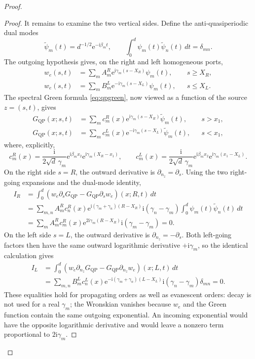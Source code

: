 \documentclass[11pt]{article}
\newcommand{\ii}{\mathrm i}
\newcommand{\ee}{\mathrm e}
\newcommand{\QP}{\mathrm{QP}}
\theoremstyle{plain}
\theoremstyle{definition}
\theoremstyle{remark}
\begin{document}
\begin{proof}
\begin{proof}
It remains to examine the two vertical sides.  Define the anti-quasiperiodic
dual modes
\[
\widetilde\psi_m(t)=d^{-1/2}\ee^{-\ii\beta_m t},\qquad
\int_0^d\psi_m(t)\widetilde\psi_n(t)\,dt=\delta_{mn}.
\]
The outgoing hypothesis gives, on the right and left homogeneous ports,
\[
\begin{aligned}
w_e(s,t)&=\sum_m A_m^R
 \ee^{\ii\gamma_m(s-X_R)}\psi_m(t),&&s\geq X_R,\\
w_e(s,t)&=\sum_m B_m^L
 \ee^{-\ii\gamma_m(s-X_L)}\psi_m(t),&&s\leq X_L.
\end{aligned}
\]
The spectral Green formula \eqref{eq:qpgreen}, now viewed as a function of
the source \(z=(s,t)\), gives
\[
\begin{aligned}
G_{\QP}(x;s,t)
 &=\sum_m c_m^R(x)\ee^{\ii\gamma_m(s-X_R)}
   \widetilde\psi_m(t),&&s>x_1,\\
G_{\QP}(x;s,t)
 &=\sum_m c_m^L(x)\ee^{-\ii\gamma_m(s-X_L)}
   \widetilde\psi_m(t),&&s<x_1,
\end{aligned}
\]
where, explicitly,
\[
c_m^R(x)=\frac{\ii}{2\sqrt d\,\gamma_m}
 \ee^{\ii\beta_mx_2}\ee^{\ii\gamma_m(X_R-x_1)},\qquad
c_m^L(x)=\frac{\ii}{2\sqrt d\,\gamma_m}
 \ee^{\ii\beta_mx_2}\ee^{\ii\gamma_m(x_1-X_L)}.
\]
On the right side \(s=R\), the outward derivative is \(\partial_{n_z}=\partial_s\).
Using the two right-going expansions and the dual-mode identity,
\[
\begin{aligned}
I_R
&=\int_0^d\left(w_e\partial_sG_{\QP}
                 -G_{\QP}\partial_sw_e\right)(x;R,t)\,dt\\
&=\sum_{m,n}A_m^R c_n^R(x)
 \ee^{\ii(\gamma_m+\gamma_n)(R-X_R)}
 \ii(\gamma_n-\gamma_m)
 \int_0^d\psi_m(t)\widetilde\psi_n(t)\,dt\\
&=\sum_m A_m^R c_m^R(x)
 \ee^{2\ii\gamma_m(R-X_R)}\ii(\gamma_m-\gamma_m)=0.
\end{aligned}
\]
On the left side \(s=L\), the outward derivative is
\(\partial_{n_z}=-\partial_s\).  Both left-going factors then have the same
outward logarithmic derivative \(+\ii\gamma_m\), so the identical calculation
gives
\[
\begin{aligned}
I_L
&=\int_0^d\left(w_e\partial_{n_z}G_{\QP}
                 -G_{\QP}\partial_{n_z}w_e\right)(x;L,t)\,dt\\
&=\sum_{m,n}B_m^L c_n^L(x)
 \ee^{-\ii(\gamma_m+\gamma_n)(L-X_L)}
 \ii(\gamma_n-\gamma_m)\delta_{mn}=0.
\end{aligned}
\]
These equalities hold for propagating orders as well as evanescent orders:
decay is not used for a real \(\gamma_m\); the Wronskian vanishes because
\(w_e\) and the Green function contain the same outgoing exponential.  An
incoming exponential would have the opposite logarithmic derivative and
would leave a nonzero term proportional to \(2\ii\gamma_m\).


\end{proof}
\end{proof}
\end{document}
